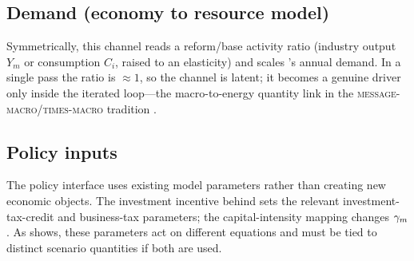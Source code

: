 \subsection{Demand (economy to resource model)}\label{sec:ch-demand}
Symmetrically, this channel reads a reform/base activity ratio (industry output $Y_m$ or
consumption $C_i$, raised to an elasticity) and scales \CLEWS{}'s annual demand. In a
single pass the ratio is $\approx1$, so the channel is latent; it becomes a genuine driver
only inside the iterated loop---the macro-to-energy quantity link in the
\textsc{message-macro}/\textsc{times-macro} tradition
\citep{messner_schrattenholzer_2000,loulou_times_2008}.

\subsection{Policy inputs}\label{sec:levers}
The policy interface uses existing model parameters rather than creating new economic
objects. The investment incentive behind  sets the relevant
investment-tax-credit and business-tax parameters; the capital-intensity mapping changes
$\gamma_{m}$. As  shows, these parameters act on different equations and
must be tied to distinct scenario quantities if both are used.
